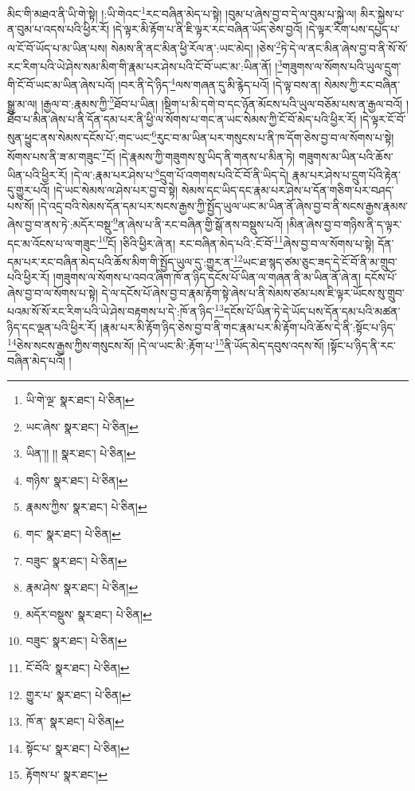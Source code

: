 མིང་གི་མཐའ་ནི་ཡི་གེ་སྟེ། །:ཡི་གེའང་\footnote{ཡི་གེ་ལྔ་  སྣར་ཐང་།  པེ་ཅིན། }རང་བཞིན་མེད་པ་སྟེ། །བུམ་པ་ཞེས་བྱ་བ་དེ་ལ་བུམ་པ་སྐྱེ་ལ། མིར་སྐྱེས་པ་ན་བུམ་པ་འདས་པའི་ཕྱིར་རོ། །དེ་ལྟར་མི་རྟོག་པ་ནི་ཇི་ལྟར་རང་བཞིན་ཡོད་ཅེས་བྱའོ། །དེ་ལྟར་རིག་པས་དཔྱད་པ་ལ་ངོ་བོ་ཡོད་པ་མ་ཡིན་པས། སེམས་ནི་ནང་མིན་ཕྱི་རོལ་ན་:ཡང་མེད། །ཅེས་\footnote{ཡང་ཞེས་  སྣར་ཐང་།  པེ་ཅིན། }ཏེ་དེ་ལ་ནང་མིན་ཞེས་བྱ་བ་ནི་སོ་སོ་རང་རིག་པའི་ཡེ་ཤེས་སམ་མིག་གི་རྣམ་པར་ཤེས་པའི་ངོ་བོ་ཡང་མ་:ཡིན་ནོ། །\footnote{ཡིན་།། །།  སྣར་ཐང་།  པེ་ཅིན། }གཟུགས་ལ་སོགས་པའི་ཡུལ་དྲུག་གི་ངོ་བོ་ཡང་མ་ཡིན་ཞེས་པའོ། །བར་ནི་དེ་ཉིད་\footnote{གཉིས་  སྣར་ཐང་།  པེ་ཅིན། }ལས་གཞན་དུ་མི་རྙེད་པའོ། །དེ་ལྟ་བས་ན། སེམས་ཀྱི་རང་བཞིན་སྒྱུ་མ་ལ། །རྒྱལ་བ་:རྣམས་ཀྱི་\footnote{རྣམས་ཀྱིས་  སྣར་ཐང་།  པེ་ཅིན། }ཐོབ་པ་ཡིན། །སྡིག་པ་མི་དགེ་བ་དང་ཉོན་མོངས་པའི་ཡུལ་བཅོམ་པས་ན་རྒྱལ་བའོ། །ཐོབ་པ་མིན་ཞེས་པ་ནི་དོན་དམ་པར་ནི་ཕྱི་ལ་སོགས་པ་གང་ན་ཡང་སེམས་ཀྱི་ངོ་བོ་མེད་པའི་ཕྱིར་རོ། །དེ་ལྟར་ངོ་བོ་སུན་ཕྱུང་ནས་སེམས་དངོས་པོ་:གང་ཡང་\footnote{གང་  སྣར་ཐང་།  པེ་ཅིན། }རུང་བ་མ་ཡིན་པར་གསུངས་པ་ནི་ཁ་དོག་ཅེས་བྱ་བ་ལ་སོགས་པ་སྟེ། སོགས་པས་ནི་ཟ་མ་གཟུང་\footnote{བཟུང་  སྣར་ཐང་།  པེ་ཅིན། }ངོ། །དེ་རྣམས་ཀྱི་གཟུགས་སུ་ཡིད་ནི་གནས་པ་མིན་ཏེ། གཟུགས་མ་ཡིན་པའི་ཆོས་ཡིན་པའི་ཕྱིར་རོ། །དེ་ལ་:རྣམ་པར་ཤེས་པ་\footnote{རྣམ་ཤེས་  སྣར་ཐང་།  པེ་ཅིན། }དྲུག་པོ་འགགས་པའི་ངོ་བོ་ནི་ཡིད་དེ། རྣམ་པར་ཤེས་པ་དྲུག་པོའི་རྟེན་དུ་གྱུར་པའོ། །དེ་ཡང་སེམས་ལ་ཤེས་པར་བྱ་བ་སྟེ། སེམས་དང་ཡིད་དང་རྣམ་པར་ཤེས་པ་དོན་གཅིག་པར་བཤད་པས་སོ། །དེ་འདྲ་བའི་སེམས་དོན་དམ་པར་སངས་རྒྱས་ཀྱི་སྤྱོད་ཡུལ་ཡང་མ་ཡིན་ནོ་ཞེས་བྱ་བ་ནི་སངས་རྒྱས་རྣམས་ཞེས་བྱ་བ་ནས་ཏེ་:མདོར་བསྡུ་\footnote{མདོར་བསྡུས་  སྣར་ཐང་།  པེ་ཅིན། }ན་ཞེས་པ་ནི་རང་བཞིན་གྱི་སྒོ་ནས་བསྡུས་པའོ། །མིན་ཞེས་བྱ་བ་གཉིས་ནི་ད་ལྟར་དང་མ་འོངས་པ་ལ་གཟུང་\footnote{བཟུང་  སྣར་ཐང་།  པེ་ཅིན། }ངོ། །ཅིའི་ཕྱིར་ཞེ་ན། རང་བཞིན་མེད་པའི་:ངོ་བོ་\footnote{ངོ་བོའི་  སྣར་ཐང་།  པེ་ཅིན། }ཞེས་བྱ་བ་ལ་སོགས་པ་སྟེ། དོན་དམ་པར་རང་བཞིན་མེད་པའི་ཆོས་མིག་གི་སྤྱོད་ཡུལ་དུ་:གྱུར་ན་\footnote{གྱུར་པ་  སྣར་ཐང་།  པེ་ཅིན། }ཡང་ཐ་སྙད་ཙམ་ཅུང་ཟད་དེ་ངོ་བོ་ནི་མ་གྲུབ་པའི་ཕྱིར་རོ། །གཟུགས་ལ་སོགས་པ་འབའ་ཞིག་ཁོ་ན་ཉིད་དངོས་པོ་ཡིན་ལ་གཞན་ནི་མ་ཡིན་ནོ་ཞེ་ན། དངོས་པོ་ཞེས་བྱ་བ་ལ་སོགས་པ་སྟེ། དེ་ལ་དངོས་པོ་ཞེས་བྱ་བ་རྣམ་རྟོག་སྟེ་ཞེས་པ་ནི་སེམས་ཙམ་པས་ཇི་ལྟར་ཡོངས་སུ་གྲུབ་པའམ་སོ་སོ་རང་རིག་པའི་ཡེ་ཤེས་བརྟགས་པ་དེ་:ཁོ་ན་ཉིད་\footnote{ཁོ་ན་  སྣར་ཐང་།  པེ་ཅིན། }དངོས་པོ་ཡིན་ཏེ་དེ་ཡོད་པས་དོན་དམ་པའི་མཚན་ཉིད་དང་ལྡན་པའི་ཕྱིར་རོ། །རྣམ་པར་མི་རྟོག་ཉིད་ཅེས་བྱ་བ་ནི་གང་རྣམ་པར་མི་རྟོག་པའི་ཆོས་དེ་ནི་:སྟོང་པ་ཉིད་\footnote{སྟོང་པ་  སྣར་ཐང་།  པེ་ཅིན། }ཅེས་སངས་རྒྱས་ཀྱིས་གསུངས་སོ། །དེ་ལ་ཡང་མི་:རྟོག་པ་\footnote{རྟོགས་པ་  སྣར་ཐང་། }ནི་ཡོད་མེད་དབུས་འདས་སོ། །སྟོང་པ་ཉིད་ནི་རང་བཞིན་མེད་པའོ། །
